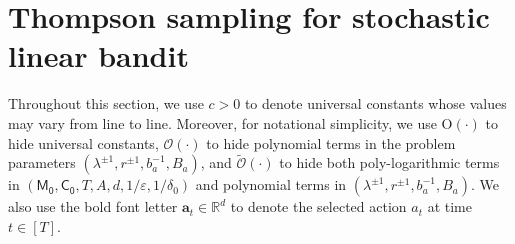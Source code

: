\documentclass[10pt]{article}
\newtheorem{lemma}[theorem]{Lemma}
\newcommand{\eps}{\varepsilon}
\renewcommand{\cO}{\mathcal{O}}
\newcommand{\<}{\left\langle}
\renewcommand{\>}{\right\rangle}
\newcommand{\DTF}{{\rm DTF}}
\renewcommand{\read}{{\sf read}}
\newcommand{\ridge}{{\rm ridge}}
\newcommand{\nrmp}[1]{{\left|\!\left|\!\left|{#1}\right|\!\right|\!\right|}}
\newcommand{\R}{\mathbb{R}}
\newcommand{\Tpsparn}{{r}} %
\newcommand{\tcO}{{\tilde{\mathcal O}}}
\newcommand{\action}{{a}}
\newcommand{\totlen}{{T}} %
\newcommand{\conO}{{\mathrm{O}}}
\newcommand{\neuron}{{\mathsf{M_0}}}
\newcommand{\weightn}{{{\mathsf{C_0}}}}
\def\btheta{{\boldsymbol \theta}}
\def\ba{{\mathbf a}}
\def\bw{{\mathbf w}}
\begin{document}


\section{Thompson sampling for stochastic linear bandit}\label{example:ts-app}

Throughout this section, we use $c>0$ to denote universal constants whose values may vary from line to line.
Moreover, for notational simplicity, we use $\conO(\cdot)$ to hide universal constants, $\cO(\cdot)$ to hide polynomial terms in the problem parameters  $(\lambda^{\pm1},\Tpsparn^{\pm1},b_a^{-1},B_a)$, and $\tcO(\cdot)$ to hide both poly-logarithmic terms in $(\neuron,\weightn,T,A,d,1/\eps,1/\delta_0)$ and polynomial terms in $(\lambda^{\pm1},\Tpsparn^{\pm1},b_a^{-1},B_a)$. We also use the bold font letter $\ba_t\in\R^d$ to denote the selected action $\action_t$ at time $t\in[\totlen]$.
\end{document}
